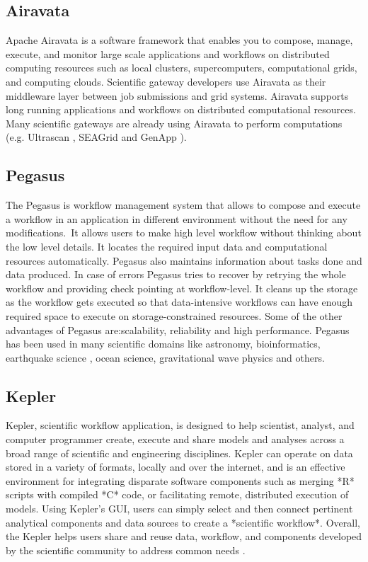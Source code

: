 \subsection{Airavata}

   Apache Airavata \cite{www-airavata} is a software framework that
   enables you to compose, manage, execute, and monitor large scale
   applications and workflows on distributed computing resources such
   as local clusters, supercomputers, computational grids, and
   computing clouds. Scientific gateway developers use Airavata as
   their middleware layer between job submissions and grid
   systems. Airavata supports long running applications and workflows
   on distributed computational resources. Many scientific gateways
   are already using Airavata to perform computations (e.g. Ultrascan
   \cite{www-ultrascan}, SEAGrid \cite{www-seagrid} and GenApp
   \cite{www-genapp}).

\subsection{Pegasus}

   The Pegasus \cite{www-Pegasus} is workflow management system 
   that allows to compose and execute a workflow in an application
   in different environment without the need  for any 
   modifications. It allows users to make high level workflow 
   without thinking about the low level details. It locates
   the required input data and computational resources automatically. 
   Pegasus also maintains information about tasks done and data 
   produced. In case of errors Pegasus tries to recover by retrying 
   the whole workflow and providing check pointing at workflow-level. 
   It cleans up the storage as the workflow gets executed so that 
   data-intensive workflows can have enough required space to execute 
   on storage-constrained resources. Some of the other advantages of 
   Pegasus are:scalability, reliability and high performance. Pegasus 
   has been used in many scientific domains like astronomy, 
   bioinformatics, earthquake science , ocean science, gravitational 
   wave physics and others.


\subsection{Kepler}
 
   Kepler, scientific workflow application, is designed to help
   scientist, analyst, and computer programmer create, execute and
   share models and analyses across a broad range of scientific and
   engineering disciplines.  Kepler can operate on data stored in a
   variety of formats, locally and over the internet, and is an
   effective environment for integrating disparate software components
   such as merging *R* scripts with compiled *C* code, or facilitating
   remote, distributed execution of models. Using Kepler's GUI, users
   can simply select and then connect pertinent analytical components
   and data sources to create a *scientific workflow*. Overall, the
   Kepler helps users share and reuse data, workflow, and components
   developed by the scientific community to address common needs
   \cite{www-kepler}.

